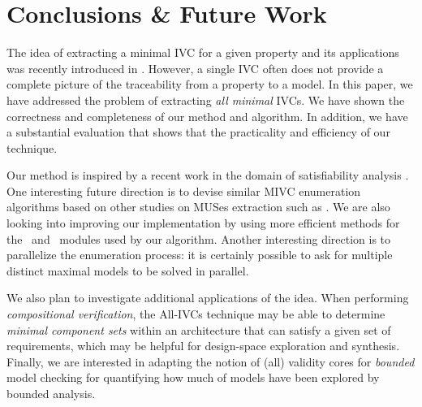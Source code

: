 \section{Conclusions \& Future Work}
\label{sec:conc}
The idea of extracting a minimal IVC for a given property and its applications was recently introduced in \cite{Ghass16}.  However, a single IVC often does not provide a complete picture of the traceability from a property to a model.  In this paper,
we have addressed the problem of extracting {\em all minimal} IVCs. We have shown
the correctness and completeness of our method and algorithm.  In addition, we have a substantial evaluation that shows that the practicality and efficiency of our technique.

Our method is inspired by a recent work in the domain of satisfiability analysis \cite{marco2016fast}. One interesting future direction is to devise similar MIVC enumeration algorithms based on other studies on MUSes extraction such as \cite{nadel2014accelerated}.  We are also looking into improving our implementation by using more  efficient methods for the \isadeq ~and \getivc ~modules used by our algorithm. Another interesting direction is to parallelize the enumeration process: it is certainly possible to ask for multiple distinct maximal models to be solved in parallel.

We also plan to investigate additional applications of the idea.  When performing {\em compositional verification}, the All-IVCs technique may be able to determine {\em minimal component sets} within an architecture that can satisfy a given set of requirements, which may be helpful for design-space exploration and synthesis. Finally, we are interested in adapting the notion of (all) validity cores for \emph{bounded} model checking for quantifying how much of models have been explored by bounded analysis. 